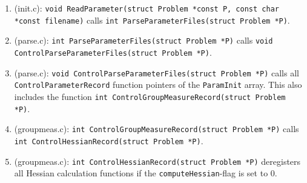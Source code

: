 \documentclass[11pt]{article}
\begin{document}
\begin{enumerate}
\item (init.c): \texttt{void ReadParameter(struct Problem *const P, const char *const filename)} calls \texttt{int ParseParameterFiles(struct Problem *P)}.
\item (parse.c): \texttt{int ParseParameterFiles(struct Problem *P)} calls \texttt{void ControlParseParameterFiles(struct Problem *P)}.
\item (parse.c): \texttt{void ControlParseParameterFiles(struct Problem *P)} calls all \texttt{ControlParameterRecord} function pointers of the \texttt{ParamInit} array. This also includes the function \texttt{int ControlGroupMeasureRecord(struct Problem *P)}.
\item (groupmeas.c): \texttt{int ControlGroupMeasureRecord(struct Problem *P)} calls \texttt{int ControlHessianRecord(struct Problem *P)}.
\item (groupmeas.c): \texttt{int ControlHessianRecord(struct Problem *P)} deregisters all Hessian calculation functions if the \texttt{computeHessian}-flag is set to 0.
\end{enumerate}
\end{document}
